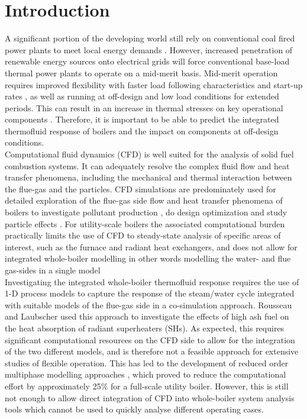 \documentclass[a4paper,fleqn]{cas-sc}
\begin{document}
\section{Introduction}\label{intro}
A significant portion of the developing world still rely on conventional coal fired power plants to meet local energy demands \cite{Rousseau2020}. However, increased penetration of renewable energy sources onto electrical grids will force conventional base-load thermal power plants to operate on a mid-merit basis. Mid-merit operation requires improved flexibility with faster load following characteristics and start-up rates \cite{Safdarnejad2019}, as well as running at off-design and low load conditions for extended periods. This can result in an increase in thermal stresses on key operational components \cite{Modlinski2019}. Therefore, it is important to be able to predict the integrated thermofluid response of boilers and the impact on components at off-design conditions.\\

Computational fluid dynamics (CFD) is well suited for the analysis of solid fuel combustion systems. It can adequately resolve the complex fluid flow and heat transfer phenomena, including the mechanical and thermal interaction between the flue-gas and the particles. CFD simulations are predominately used for detailed exploration of the flue-gas side flow and heat transfer phenomena of boilers to investigate pollutant production \cite{Liu2021}, do design optimization \cite{dugum2019, Gu2020} and study particle effects \cite{Laubscher2020}. For utility-scale boilers the associated computational burden practically limits the use of CFD to steady-state analysis of specific areas of interest, such as the furnace and radiant heat exchangers, and does not allow for integrated whole-boiler modelling in other words modelling the water- and flue gas-sides in a single model\\

Investigating the integrated whole-boiler thermofluid response requires the use of 1-D process models to capture the response of the steam/water cycle integrated with suitable models of the flue-gas side in a co-simulation approach. Rousseau and Laubscher \cite{Rousseau2020} used this approach to investigate the effects of high ash fuel on the heat absorption of radiant superheaters (SHs). As expected, this requires significant computational resources on the CFD side to allow for the integration of the two different models, and is therefore not a feasible approach for extensive studies of flexible operation. This has led to the development of reduced order multiphase modelling approaches \cite{Rawlins2021, INFUB2022}, which proved to reduce the computational effort by approximately 25\% for a full-scale utility boiler.  However, this is still not enough to allow direct integration of CFD into whole-boiler system analysis tools which cannot be used to quickly analyse different operating cases. \\
\end{document}
